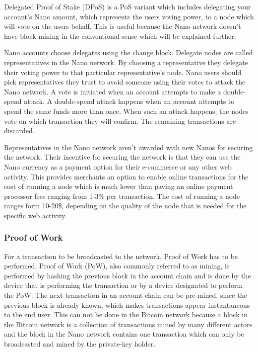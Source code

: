 \documentclass{ferseminar}
\begin{document}
Delegated Proof of Stake (DPoS) is a PoS variant which includes delegating your account's Nano amount, which represents the users voting power, to a node which will vote on the users behalf. This is useful because the Nano network doesn't have block mining in the conventional sense which will be explained further. 

Nano accounts choose delegates using the change block. Delegate nodes are called representatives in the Nano network. By choosing a representative they delegate their voting power to that particular representative's node. Nano users should pick representatives they trust to avoid someone using their votes to attack the Nano network. A vote is initiated when an account attempts to make a double-spend attack. A double-spend attack happens when an account attempts to spend the same funds more than once. When such an attack happens, the nodes vote on which transaction they will confirm. The remaining transactions are discarded.

Representatives in the Nano network aren't awarded with new Nanos for securing the network. Their incentive for securing the network is that they can use the Nano currency as a payment option for their e-commerce or any other web activity. This provides merchants an option to enable online transactions for the cost of running a node which is much lower than paying an online payment processor fees ranging from 1-3\% per transaction. The cost of running a node ranges form 10-20\$, depending on the quality of the node that is needed for the specific web activity.
\subsubsection{Proof of Work}

For a transaction to be broadcasted to the network, Proof of Work has to be performed. Proof of Work (PoW), also commonly referred to as mining, is performed by hashing the previous block in the account chain and is done by the device that is performing the transaction or by a device designated to perform the PoW. The next transaction in an account chain can be pre-mined, since the previous block is already known, which makes transactions appear instantaneous to the end user. This can not be done in the Bitcoin network because a block in the Bitcoin network is a collection of transactions mined by many different actors and the block in the Nano network contains one transaction which can only be broadcasted and mined by the private-key holder.
\end{document}
